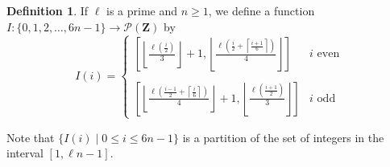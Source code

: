 \documentclass{article}
\theoremstyle{remark}
\theoremstyle{definition}
\newtheorem{definition}[theorem]{Definition}
\begin{document}
\begin{definition}If $\ell$ is a prime and $n \geq 1$, we define a function $I: \{0,1,2,\ldots,6n-1\} \to \mathcal{P}(\mathbf{\mathbf{Z}})$ by 
\[I(i) = \begin{cases}
    \left[\left \lfloor \frac{\ell\left(\frac{i}{2} \right )}{3} \right \rfloor + 1, \left \lfloor \frac{\ell \left( \frac{i}{2} +  \left \lceil \frac{i+1}{6}\right \rceil \right )}{4} \right \rfloor \right] & i \textrm{ even} \\\\

    \left[ \left \lfloor \frac{\ell \left ( \frac{i-1}{2} + \left \lceil \frac{i}{6}\right \rceil \right)}{4} \right \rfloor + 1,  \left \lfloor \frac{\ell\left( \frac{i+1}{2} \right)}{3}\right \rfloor \right] & i \textrm{ odd}
\end{cases}\]

\end{definition}

Note that $\{I(i) \mid 0 \leq i \leq 6n-1\}$ is a partition of the set of integers in the interval $[1,\ell n-1]$.
\end{document}
